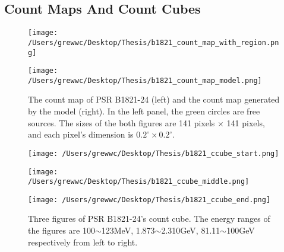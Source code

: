 \documentclass[12pt]{report}
\newcommand{\mycaption}[1]{\protect \caption{#1}}
\begin{document}
              \subsection{Count Maps And Count Cubes}
                \begin{figure}[!ht]
                  \begin{center}
                  \begin{minipage}{0.45\textwidth}
                    \centering 
                    \texttt{[image: /Users/grewwc/Desktop/Thesis/b1821\_count\_map\_with\_region.png]}
                  \end{minipage}
                  \begin{minipage}{0.45\textwidth}
                    \centering
                    \texttt{[image: /Users/grewwc/Desktop/Thesis/b1821\_count\_map\_model.png]}
                  \end{minipage}
                \end{center}
                \mycaption{The count map of PSR B1821-24 (left) and the count map generated by 
                  the model (right). In the left panel, the green circles are free sources. The 
                  sizes of the both figures are 141 pixels $\times$ 141 pixels, and each 
                  pixel's dimension is $0.2^\circ \times 0.2^\circ$.}
                \label{fig: b1821_count_map_with_region_and_model}
              \end{figure}
            
              \begin{figure}[!ht]
                \begin{center}
                \begin{minipage}{0.31\textwidth}
                  \begin{center} 
                    \texttt{[image: /Users/grewwc/Desktop/Thesis/b1821\_ccube\_start.png]}
                  \end{center}
                \end{minipage}
                \begin{minipage}{0.31\textwidth}
                  \begin{center}
                    \texttt{[image: /Users/grewwc/Desktop/Thesis/b1821\_ccube\_middle.png]}
                  \end{center}
                \end{minipage}
                \begin{minipage}{0.31\textwidth}
                  \begin{center}
                  \texttt{[image: /Users/grewwc/Desktop/Thesis/b1821\_ccube\_end.png]}
                  \end{center}
                \end{minipage}
              \end{center}
              \mycaption{Three figures of PSR B1821-24's count cube. The energy ranges of the figures are  
                100$\sim$123MeV, 1.873$\sim$2.310GeV, 81.11$\sim$100GeV respectively from left to right.}
              \label{fig: b1821_ccube_1_15_33.png}
              \end{figure}
\end{document}
